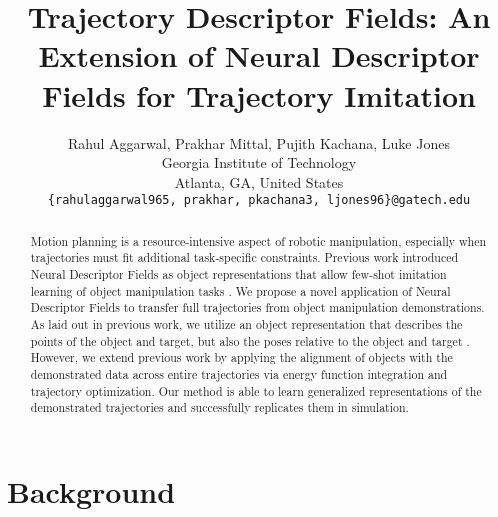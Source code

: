 \documentclass[10pt,twocolumn,letterpaper]{article}
\begin{document}
\title{Trajectory Descriptor Fields: An Extension of Neural Descriptor Fields for Trajectory Imitation}

\author{Rahul Aggarwal, Prakhar Mittal, Pujith Kachana, Luke Jones\\
Georgia Institute of Technology\\
Atlanta, GA, United States\\
{\tt\small \{rahulaggarwal965, prakhar, pkachana3, ljones96\}@gatech.edu}
}

\maketitle

\begin{abstract}
   Motion planning is a resource-intensive aspect of robotic manipulation, especially when trajectories must fit additional task-specific constraints. Previous work introduced Neural Descriptor Fields as object representations that allow few-shot imitation learning of object manipulation tasks \cite{simeonovdu2021ndf}. We propose a novel application of Neural Descriptor Fields to transfer full trajectories from object manipulation demonstrations. As laid out in previous work, we utilize an object representation that describes the points of the object and target, but also the poses relative to the object and target \cite{simeonovdu2021ndf}. However, we extend previous work by applying the alignment of objects with the demonstrated data across entire trajectories via energy function integration and trajectory optimization. Our method is able to learn generalized representations of the demonstrated trajectories and successfully replicates them in simulation.
\end{abstract}

\section{Background}
\end{document}
